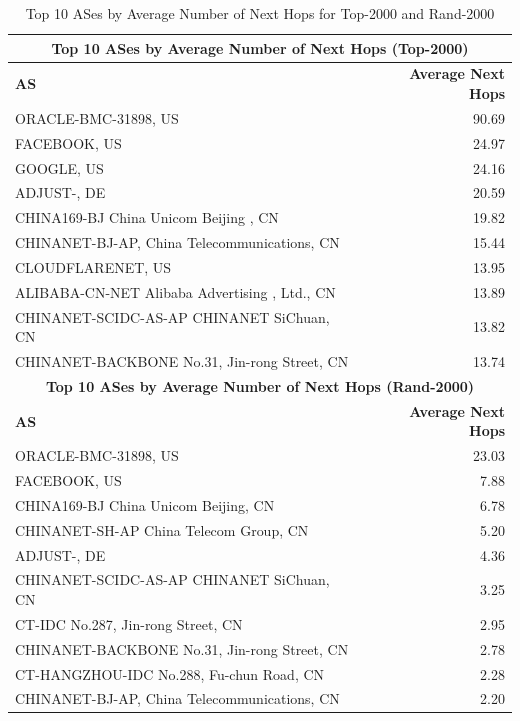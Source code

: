 \documentclass[12pt]{cwru_thesis}
\begin{document}
\begin{table}[h!]
    \centering
    \begin{tabularx}{\textwidth}{|X|r|}
        \hline
        \multicolumn{2}{|c|}{\textbf{Top 10 ASes by Average Number of Next Hops (Top-2000)}} \\
        \hline
        \textbf{AS} & \textbf{Average Next Hops} \\
        \hline
        ORACLE-BMC-31898, US & 90.69 \\
        FACEBOOK, US & 24.97 \\
        GOOGLE, US& 24.16 \\
        ADJUST-, DE & 20.59 \\
        CHINA169-BJ China Unicom Beijing , CN & 19.82 \\
        CHINANET-BJ-AP, China Telecommunications, CN & 15.44 \\
        CLOUDFLARENET, US & 13.95 \\
        ALIBABA-CN-NET Alibaba Advertising , Ltd., CN & 13.89 \\
        CHINANET-SCIDC-AS-AP CHINANET SiChuan, CN & 13.82 \\
        CHINANET-BACKBONE No.31, Jin-rong Street, CN & 13.74 \\
        \hline
        \multicolumn{2}{|c|}{\textbf{Top 10 ASes by Average Number of Next Hops (Rand-2000)}} \\
        \hline
        \textbf{AS} & \textbf{Average Next Hops} \\
        \hline
        ORACLE-BMC-31898, US & 23.03 \\
        FACEBOOK, US & 7.88 \\
        CHINA169-BJ China Unicom Beijing, CN  & 6.78 \\
        CHINANET-SH-AP China Telecom Group, CN & 5.20 \\
        ADJUST-, DE& 4.36 \\
        CHINANET-SCIDC-AS-AP CHINANET SiChuan, CN & 3.25 \\
        CT-IDC No.287, Jin-rong Street, CN  & 2.95 \\
        CHINANET-BACKBONE No.31, Jin-rong Street, CN & 2.78 \\
        CT-HANGZHOU-IDC No.288, Fu-chun Road, CN & 2.28 \\
        CHINANET-BJ-AP, China Telecommunications, CN & 2.20 \\
        \hline
    \end{tabularx}
    \caption{Top 10 ASes by Average Number of Next Hops for Top-2000 and Rand-2000}
    \label{tab:as_next_hops}
\end{table}
\end{document}

